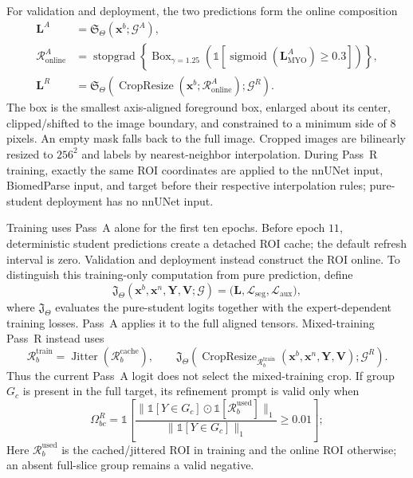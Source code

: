\documentclass[10pt]{article}
\newcommand{\cL}{\mathcal{L}}
\newcommand{\cG}{\mathcal{G}}
\newcommand{\sigm}{\operatorname{sigmoid}}
\newcommand{\stopgrad}{\operatorname{stopgrad}}
\newcommand{\RoiBox}{\operatorname{Box}}
\newcommand{\Crop}{\operatorname{CropResize}}
\newcommand{\ind}{\mathbb{1}}
\begin{document}
For validation and deployment, the two predictions form the online composition
\begin{equation}
\boxed{
\begin{aligned}
 \bm L^A
   &=\mathfrak S_\Theta(\bm x^b;\cG^A),\\
 \mathcal R^A_{\mathrm{online}}
   &=\stopgrad\!\left\{\RoiBox_{\gamma=1.25}\!\left(
      \ind[\sigm(\bm L^A_{\mathrm{MYO}})\geq0.3]
      \right)\right\},\\
 \bm L^R
   &=\mathfrak S_\Theta(
       \Crop(\bm x^b;\mathcal R^A_{\mathrm{online}});\cG^R).
\end{aligned}}
\label{eq:two-pass-composition}
\end{equation}
The box is the smallest axis-aligned foreground box, enlarged about its center,
clipped/shifted to the image boundary, and constrained to a minimum side of
$8$ pixels.  An empty mask falls back to the full image.  Cropped images are
bilinearly resized to $256^2$ and labels by nearest-neighbor interpolation.
During Pass~R training, exactly the same ROI coordinates are applied to the
nnUNet input, BiomedParse input, and target before their respective
interpolation rules; pure-student deployment has no nnUNet input.

Training uses Pass~A alone for the first ten epochs.  Before epoch $11$,
deterministic student predictions create a detached ROI cache; the default
refresh interval is zero.  Validation and deployment instead construct the ROI
online.  To distinguish this training-only computation from pure prediction,
define
\begin{equation}
 \mathfrak J_\Theta(\bm x^b,\bm x^n,\bm Y,\bm V;\cG)
 =\bigl(\bm L,\cL_{\mathrm{seg}},\cL_{\mathrm{aux}}\bigr),
 \label{eq:training-evaluator}
\end{equation}
where $\mathfrak J_\Theta$ evaluates the pure-student logits together with the
expert-dependent training losses.  Pass~A applies it to the full aligned
tensors.  Mixed-training Pass~R instead uses
\begin{equation}
 \mathcal R^{\mathrm{train}}_b
   =\operatorname{Jitter}(\mathcal R^{\mathrm{cache}}_b),
 \qquad
 \mathfrak J_\Theta\!\left(
   \Crop_{\mathcal R^{\mathrm{train}}_b}
   (\bm x^b,\bm x^n,\bm Y,\bm V);\cG^R\right).
 \label{eq:cached-training-roi}
\end{equation}
Thus the current Pass~A logit does not select the mixed-training crop.  If group
$G_c$ is present in the full target, its refinement prompt is
valid only when
\begin{equation}
    \Omega^R_{bc}
    =\ind\!\left[
      \frac{\|\ind[Y\in G_c]\odot\ind[\mathcal R^{\mathrm{used}}_b]\|_1}
           {\|\ind[Y\in G_c]\|_1}\geq0.01\right];
\end{equation}
Here $\mathcal R^{\mathrm{used}}_b$ is the cached/jittered ROI in training and
the online ROI otherwise; an absent full-slice group remains a valid negative.
\end{document}
